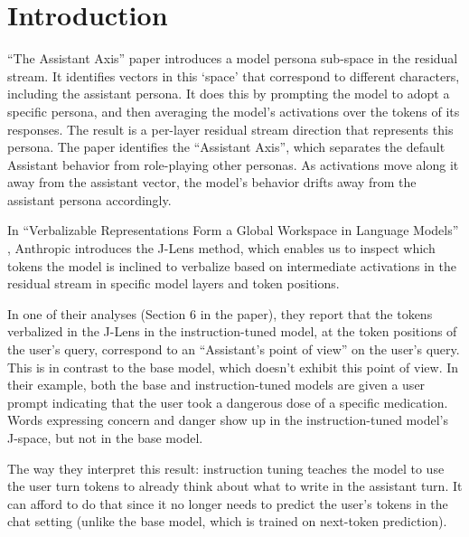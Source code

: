 \section{Introduction}
\label{sec:introduction}

``The Assistant Axis'' paper \citep{lu2026assistant} introduces a model persona sub-space in the residual stream.
It identifies vectors in this `space' that correspond to different characters, including the assistant persona. It does this by prompting the model to adopt a specific persona, and then averaging the model's activations over the tokens of its responses. The result is a per-layer residual stream direction that represents this persona. 
The paper identifies the ``Assistant Axis'', which separates the default Assistant behavior from role-playing other personas. As activations move along it away from the assistant vector, the model's behavior drifts away from the assistant persona accordingly.

In ``Verbalizable Representations Form a Global Workspace in Language Models'' \citep{gurnee2026global}, Anthropic introduces the J-Lens method, which enables us to inspect which tokens the model is inclined to verbalize based on intermediate activations in the residual stream in specific model layers and token positions.

In one of their analyses (Section 6 in the paper), they report that the tokens verbalized in the J-Lens in the instruction-tuned model, at the token positions of the user's query, correspond to an ``Assistant's point of view'' on the user's query. This is in contrast to the base model, which doesn't exhibit this point of view. In their example, both the base and instruction-tuned models are given a user prompt indicating that the user took a dangerous dose of a specific medication.
Words expressing concern and danger show up in the instruction-tuned model's J-space, but not in the base model.

The way they interpret this result: instruction tuning teaches the model to use the user turn tokens to already think about what to write in the assistant turn. It can afford to do that since it no longer needs to predict the user's tokens in the chat setting (unlike the base model, which is trained on next-token prediction).

